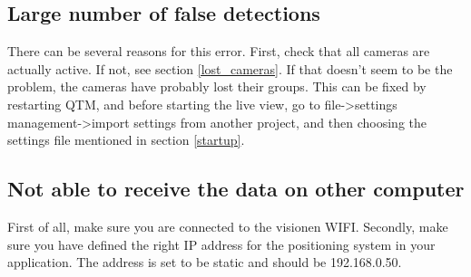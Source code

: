 \documentclass{article}
\begin{document}
\subsection{Large number of false detections}
There can be several reasons for this error. First, check that all cameras are actually active. If not, see section \ref{lost_cameras}. If that doesn't seem to be the problem, the cameras have probably lost their groups. This can be fixed by restarting QTM, and before starting the live view, go to file->settings management->import settings from another project, and then choosing the settings file mentioned in section \ref{startup}.

\subsection{Not able to receive the data on other computer}
First of all, make sure you are connected to the visionen WIFI. Secondly, make sure you have defined the right IP address for the positioning system in your application. The address is set to be static and should be 192.168.0.50.
\end{document}
